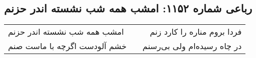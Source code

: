 \begin{center}
\section*{رباعی شماره ۱۱۵۲: امشب همه شب نشسته اندر حزنم}
\label{sec:1152}
\begin{longtable}{l p{0.5cm} r}
امشب همه شب نشسته اندر حزنم
&&
فردا بروم مناره را کارد زنم
\\
خشم آلودست اگرچه با ماست صنم
&&
در چاه رسیده‌ام ولی بی‌رسنم
\\
\end{longtable}
\end{center}
